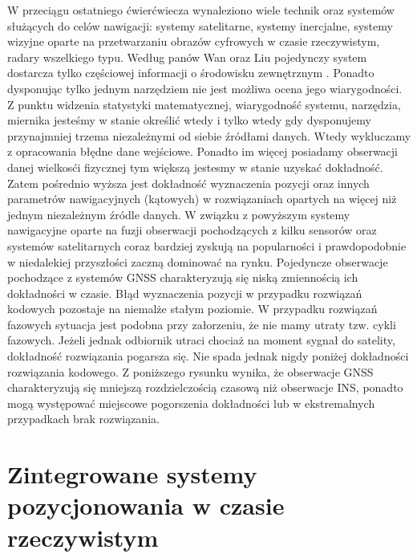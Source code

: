 W przeciągu ostatniego ćwierćwiecza wynaleziono wiele technik oraz systemów służących do celów nawigacji: systemy satelitarne, systemy inercjalne,
systemy wizyjne oparte na przetwarzaniu obrazów cyfrowych w czasie rzeczywistym, radary wszelkiego typu.
Według panów Wan oraz Liu pojedynczy system dostarcza tylko częściowej informacji o środowisku zewnętrznym \cite[][strona 770]{CCTA_769_775}.
Ponadto dysponując tylko jednym narzędziem nie jest możliwa ocena jego wiarygodności. Z punktu widzenia statystyki matematycznej,
wiarygodność systemu, narzędzia, miernika jesteśmy w stanie określić wtedy i tylko wtedy gdy dysponujemy przynajmniej trzema niezależnymi od siebie źródłami danych.
Wtedy wykluczamy z opracowania błędne dane wejściowe. Ponadto im więcej posiadamy obserwacji danej wielkosći fizycznej tym większą jestesmy w stanie uzyskać dokładność.
Zatem pośrednio wyższa jest dokładność wyznaczenia pozycji oraz innych parametrów nawigacyjnych (kątowych)
w rozwiązaniach opartych na więcej niż jednym niezależnym źródle danych. W związku z powyższym systemy nawigacyjne oparte na fuzji obserwacji
pochodzących z kilku sensorów oraz systemów satelitarnych coraz bardziej zyskują na popularności \cite[][strona 770]{CCTA_769_775}
i prawdopodobnie w niedalekiej przyszłości zaczną dominować na rynku.
Pojedyncze obserwacje pochodzące z systemów GNSS charakteryzują się niską zmiennością ich dokładności w czasie.
Błąd wyznaczenia pozycji w przypadku rozwiązań kodowych pozostaje na niemalże stałym poziomie. 
W przypadku rozwiązań fazowych sytuacja jest podobna przy załorzeniu, że nie mamy utraty tzw. cykli fazowych.
Jeżeli jednak odbiornik utraci chociaż na moment sygnał do satelity, dokładność rozwiązania pogarsza się.
Nie spada jednak nigdy poniżej dokładności rozwiązania kodowego. Z poniższego rysunku wynika,
że obserwacje GNSS charakteryzują się mniejszą rozdzielczością czasową niż obserwacje INS,
ponadto mogą występować miejscowe pogorszenia dokładności lub w ekstremalnych przypadkach brak rozwiązania.
\section{Zintegrowane systemy pozycjonowania w czasie rzeczywistym}
